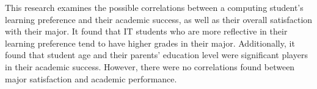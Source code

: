 \afterpage{\cleardoublepage}
This research examines the possible correlations between a computing student's learning preference and their academic success, as well as their overall satisfaction with their major. It found that IT students who are more reflective in their learning preference tend to have higher grades in their major. Additionally, it found that student age and their parents' education level were significant players in their academic success. However, there were no correlations found between major satisfaction and academic performance.
